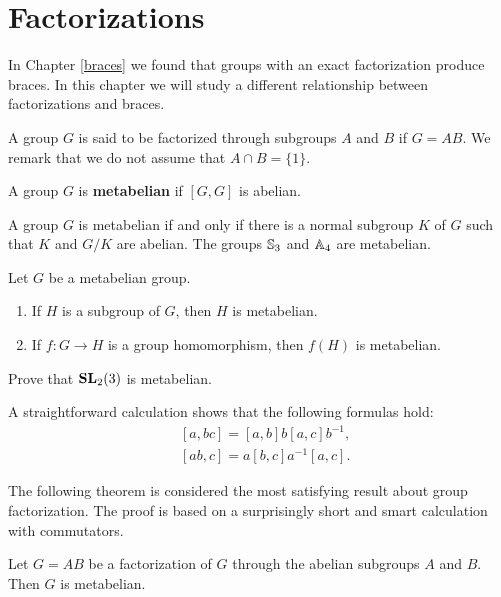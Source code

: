 \chapter{Factorizations}
\label{factorizations}

In Chapter \ref{braces} we found that groups with an exact factorization 
produce braces. In this chapter we will study a different relationship between
factorizations and braces. 

A group $G$ is said to be 
factorized through subgroups $A$ and $B$ if $G=AB$. We remark that we do not assume that
$A\cap B=\{1\}$. 

\begin{definition}
	A group $G$ is \textbf{metabelian} if $[G,G]$ is abelian. 
\end{definition}

A group $G$ is metabelian if and only if there is a normal subgroup 
$K$ of $G$ such that $K$ and $G/K$ are abelian. 
The groups $\mathbb{S}_3$ and $\mathbb{A}_4$ are metabelian. 

\begin{exercise}
	Let $G$ be a metabelian group.  
	\begin{enumerate}
		\item If $H$ is a subgroup of $G$, then $H$ is metabelian. 
		\item If $f\colon G\to H$ is a group homomorphism, then $f(H)$ is metabelian.
	\end{enumerate}
\end{exercise}

\begin{exercise}
	Prove that $\mathbf{SL}_2(3)$ is metabelian. 
\end{exercise}

A straightforward calculation shows that 
the following formulas hold: 
\begin{align*}
&[a,bc]=[a,b]b[a,c]b^{-1},\\ 
&[ab,c]=a[b,c]a^{-1}[a,c].
\end{align*}

The following theorem is considered the most satisfying result about group factorization. The proof
is based on a surprisingly short and smart calculation with commutators. 

\begin{theorem}[It\^o]
	\label{theorem:Ito}
	Let $G=AB$ be a factorization of $G$ through the abelian subgroups $A$ and $B$. 
	Then $G$ is metabelian.
\end{theorem}

